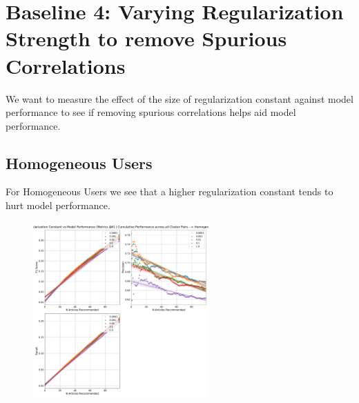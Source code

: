 \documentclass[a4paper,fontsize=9.0pt]{scrartcl}
\begin{document}
\section{Baseline 4: Varying Regularization Strength to remove Spurious Correlations}
\begin{flushleft}
We want to measure the effect of the size of regularization constant against model performance to see if removing spurious correlations helps aid model performance.

\subsection{Homogeneous Users}
\begin{flushleft}
For Homogeneous Users we see that a higher regularization constant tends to hurt model performance.
\end{flushleft}
\end{flushleft}
\begin{figure}[H]
 \includegraphics[width=0.6\textwidth]{Graphs/regularization_vs_model_performance_cumu_Homogeneous.pdf}
\end{figure}
\end{document}
